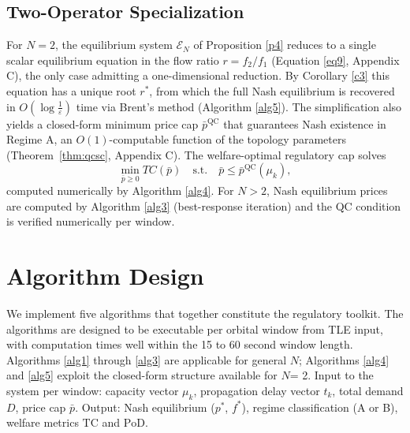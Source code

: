 \documentclass[review,3p,authoryear]{elsarticle}
\begin{document}
\subsection{Two-Operator Specialization}
\label{sec4}

For $N=2$, the equilibrium system $\mathscr{E}_{N}$ of Proposition \ref{p4} reduces to a single scalar equilibrium equation in the flow ratio $r=f_{2}/f_{1}$ (Equation \eqref{eq9}, Appendix C), the only case admitting a one-dimensional reduction. By Corollary \ref{c3} this equation has a unique root $r^{*}$, from which the full Nash equilibrium is recovered in $O(\log\frac{1}{{\varepsilon}})$ time via Brent's method (Algorithm \ref{alg5}). The simplification also yields a closed-form minimum price cap $\bar{p}^{\mathrm{QC}}$ that guarantees Nash existence in Regime A, an $O(1)$-computable function of the topology parameters (Theorem~\ref{thm:qcsc}, Appendix C). The welfare-optimal regulatory cap solves
\begin{equation}
    \min_{\bar{p} \ge 0} TC(\bar{p}) \quad\text{s.t.}\quad \bar{p} \le \bar{p}^{\mathrm{QC}}(\mu_k),
    \label{eq7}
\end{equation}
computed numerically by Algorithm \ref{alg4}. For $N>2$, Nash equilibrium prices are computed by Algorithm \ref{alg3} (best-response iteration) and the QC condition is verified numerically per window.

\section{Algorithm Design}
\label{sec5}

We implement five algorithms that together constitute the regulatory toolkit. The algorithms are designed to be executable per orbital window from TLE input, with computation times well within the 15 to 60 second window length. Algorithms \ref{alg1} through \ref{alg3} are applicable for general $N$; Algorithms \ref{alg4} and \ref{alg5} exploit the closed-form structure available for $N$= 2. Input to the system per window: capacity vector ${\mu}_{k}$, propagation delay vector $t_{k}$, total demand $D$, price cap \ensuremath{\bar{p}}. Output: Nash equilibrium ($p^{*}$, $f^{*}$), regime classification (A or B), welfare metrics $\mathrm{TC}$ and $\mathrm{PoD}$.
\end{document}
